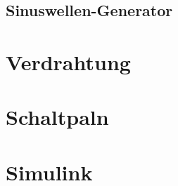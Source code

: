 \subsection{Sinuswellen-Generator}
\label{Sinuswellen-Generator}





\section{Verdrahtung}

\section{Schaltpaln}

\section{Simulink}

\